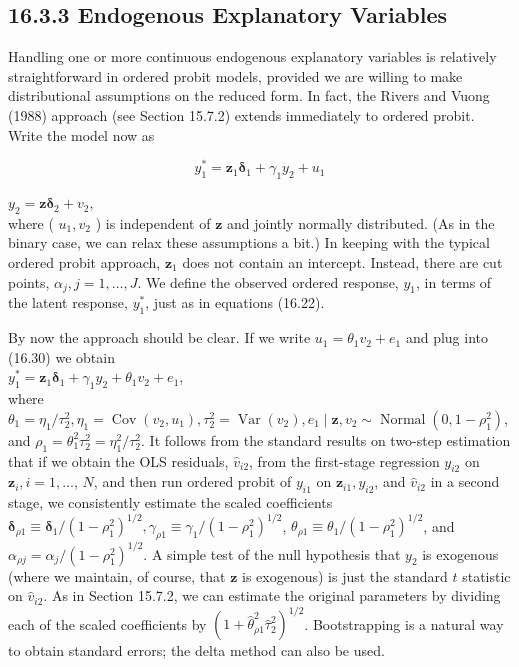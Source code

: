 \documentclass[10pt]{article}
\begin{document}
\subsection*{16.3.3 Endogenous Explanatory Variables}
Handling one or more continuous endogenous explanatory variables is relatively straightforward in ordered probit models, provided we are willing to make distributional assumptions on the reduced form. In fact, the Rivers and Vuong (1988) approach (see Section 15.7.2) extends immediately to ordered probit. Write the model now as


\begin{equation*}
y_{1}^{*}=\mathbf{z}_{1} \boldsymbol{\delta}_{1}+\gamma_{1} y_{2}+u_{1} \tag{16.30}
\end{equation*}


$y_{2}=\mathbf{z} \boldsymbol{\delta}_{2}+v_{2}$,\\
where ( $u_{1}, v_{2}$ ) is independent of $\mathbf{z}$ and jointly normally distributed. (As in the binary case, we can relax these assumptions a bit.) In keeping with the typical ordered probit approach, $\mathbf{z}_{1}$ does not contain an intercept. Instead, there are cut points, $\alpha_{j}, j= 1, \ldots, J$. We define the observed ordered response, $y_{1}$, in terms of the latent response, $y_{1}^{*}$, just as in equations (16.22).

By now the approach should be clear. If we write $u_{1}=\theta_{1} v_{2}+e_{1}$ and plug into (16.30) we obtain\\
$y_{1}^{*}=\mathbf{z}_{1} \boldsymbol{\delta}_{1}+\gamma_{1} y_{2}+\theta_{1} v_{2}+e_{1}$,\\
where $\theta_{1}=\eta_{1} / \tau_{2}^{2}, \eta_{1}=\operatorname{Cov}\left(v_{2}, u_{1}\right), \tau_{2}^{2}=\operatorname{Var}\left(v_{2}\right), e_{1} \mid \mathbf{z}, v_{2} \sim \operatorname{Normal}\left(0,1-\rho_{1}^{2}\right)$, and $\rho_{1}=\theta_{1}^{2} \tau_{2}^{2}=\eta_{1}^{2} / \tau_{2}^{2}$. It follows from the standard results on two-step estimation that if we obtain the OLS residuals, $\hat{v}_{i 2}$, from the first-stage regression $y_{i 2}$ on $\mathbf{z}_{i}, i=1, \ldots$, $N$, and then run ordered probit of $y_{i 1}$ on $\mathbf{z}_{i 1}, y_{i 2}$, and $\hat{v}_{i 2}$ in a second stage, we consistently estimate the scaled coefficients $\boldsymbol{\delta}_{\rho 1} \equiv \boldsymbol{\delta}_{1} /\left(1-\rho_{1}^{2}\right)^{1 / 2}, \gamma_{\rho 1} \equiv \gamma_{1} /\left(1-\rho_{1}^{2}\right)^{1 / 2}$, $\theta_{\rho 1} \equiv \theta_{1} /\left(1-\rho_{1}^{2}\right)^{1 / 2}$, and $\alpha_{\rho j}=\alpha_{j} /\left(1-\rho_{1}^{2}\right)^{1 / 2}$. A simple test of the null hypothesis that $y_{2}$ is exogenous (where we maintain, of course, that $\mathbf{z}$ is exogenous) is just the standard $t$ statistic on $\hat{v}_{i 2}$. As in Section 15.7.2, we can estimate the original parameters by dividing each of the scaled coefficients by $\left(1+\hat{\theta}_{\rho 1}^{2} \hat{\tau}_{2}^{2}\right)^{1 / 2}$. Bootstrapping is a natural way to obtain standard errors; the delta method can also be used.
\end{document}
